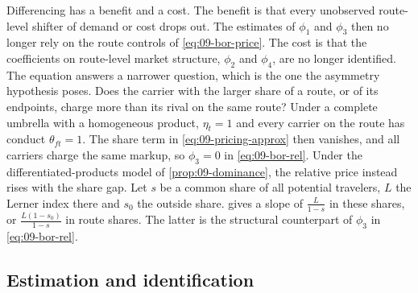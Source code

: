 Differencing has a benefit and a cost. The benefit is that every unobserved route-level shifter of demand or
cost drops out. The estimates of $\phi_1$ and $\phi_3$ then no longer rely on the route controls of
\cref{eq:09-bor-price}. The cost is that the coefficients on route-level market structure, $\phi_2$ and
$\phi_4$, are no longer identified. The equation answers a narrower question, which is the one the asymmetry
hypothesis poses. Does the carrier with the larger share of a route, or of its endpoints, charge more than its
rival on the same route? Under a complete umbrella with a homogeneous product, $\eta_t = 1$ and every carrier on
the route has conduct $\theta_{ft} = 1$. The share term in \cref{eq:09-pricing-approx} then vanishes, and all
carriers charge the same markup, so $\phi_3 = 0$ in \cref{eq:09-bor-rel}. Under the differentiated-products
model of \cref{prop:09-dominance}, the relative price instead rises with the share gap. Let $s$ be a common
share of all potential travelers, $L$ the Lerner index there and $s_0$ the outside share. 
gives a slope of $\frac{L}{1-s}$ in these shares, or $\frac{L(1-s_0)}{1-s}$ in route shares. The latter is
the structural counterpart of $\phi_3$ in \cref{eq:09-bor-rel}.

\subsection{Estimation and identification}\label{sec:09-bor-ident}

